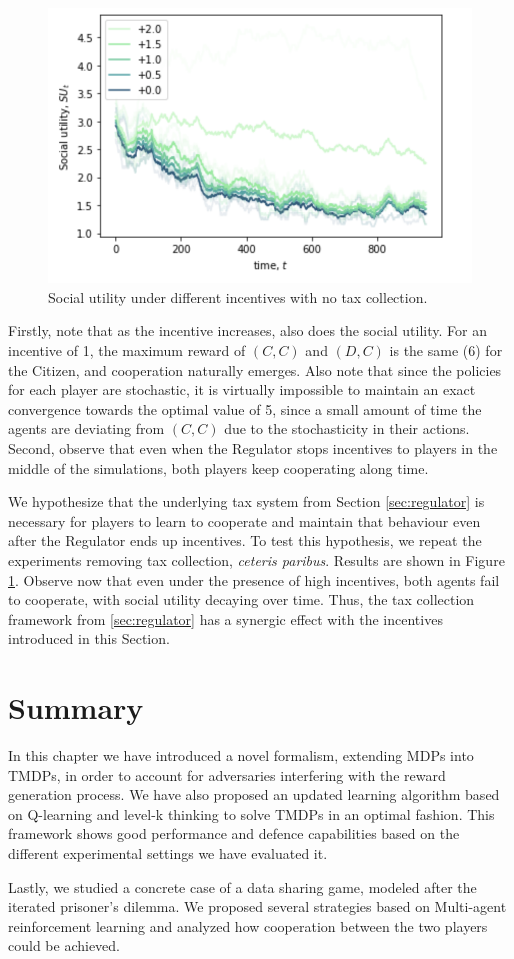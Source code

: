 \begin{figure}[!h]
\centering
\includegraphics[width=0.6\linewidth]{img/inc2.png}
\caption{Social utility under different incentives with no tax collection.}\label{fig:inc2}
\end{figure}


Firstly, note that as the incentive increases, also does the social utility.
For an incentive of 1, the maximum reward of $(C, C)$ and $(D, C)$ is the same (6) for the Citizen, and cooperation naturally emerges. Also note that since the policies for each player are stochastic, it is virtually impossible to maintain an exact convergence towards the optimal value of 5, since a small amount of time the agents are deviating from $(C,C)$ due to the stochasticity in their actions. Second,
observe that even when the Regulator stops incentives to players in the middle of the simulations, both players keep cooperating along time.

We hypothesize that the underlying tax system from Section \ref{sec:regulator} is necessary for players to learn to cooperate and maintain that behaviour even after the Regulator ends up incentives. To test this hypothesis, we repeat the experiments removing tax collection, \emph{ceteris paribus}. Results are shown in Figure \ref{fig:inc2}. Observe now that even under the presence of high incentives, both agents fail to cooperate, with social utility decaying over time. Thus,  the tax collection framework from \ref{sec:regulator} has a synergic effect with the incentives introduced in this Section.



\section{Summary}

In this chapter we have introduced a novel formalism, extending MDPs into TMDPs, in order to account for adversaries interfering with the reward generation process. We have also proposed an updated learning algorithm based on Q-learning and level-k thinking to solve TMDPs in an optimal fashion. This framework shows good performance and defence capabilities based on the different experimental settings we have evaluated it.

Lastly, we studied a concrete case of a data sharing game, modeled after the iterated prisoner's dilemma. We proposed several strategies based on Multi-agent reinforcement learning and analyzed how cooperation between the two players could be achieved.